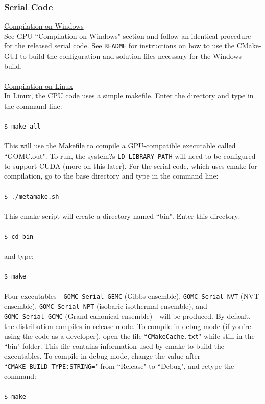 \subsubsection{Serial Code}
\underline{Compilation on Windows}\\
See GPU ``Compilation on Windows" section and follow an identical procedure for the released serial code. See \texttt{README} for instructions on how to use the CMake-GUI to build the configuration and solution files necessary for the Windows build.\\\\
\underline{Compilation on Linux}\\
In Linux, the CPU code uses a simple makefile. Enter the directory and type in the command line:\\\\
\texttt{\$ make all}\\\\
This will use the Makefile to compile a GPU-compatible executable called ``GOMC.out".  To run, the system?s \texttt{LD\_LIBRARY\_PATH} will need to be configured to support CUDA (more on this later).
For the serial code, which uses cmake for compilation, go to the base directory and type in the command line:\\\\
\texttt{\$ ./metamake.sh}\\\\
This cmake script will create a directory named ``bin".  Enter this directory:\\\\
\texttt{\$ cd bin}\\\\
and type:\\\\
\texttt{\$ make}\\\\
Four executables - \texttt{GOMC\_Serial\_GEMC} (Gibbs ensemble), \texttt{GOMC\_Serial\_NVT} (NVT ensemble), \texttt{GOMC\_Serial\_NPT} (isobaric-isothermal ensemble), and \texttt{GOMC\_Serial\_GCMC} (Grand canonical ensemble) - will be produced. By default, the distribution compiles in release mode.  To compile in debug mode (if you're using the code as a developer), open the file ``\texttt{CMakeCache.txt}" while still in the ``bin" folder.  This file contains information used by cmake to build the executables.  To compile in debug mode, change the value after ``\texttt{CMAKE\_BUILD\_TYPE:STRING=}" from ``Release" to ``Debug", and retype the command:\\\\ \texttt{\$ make}\\\\
